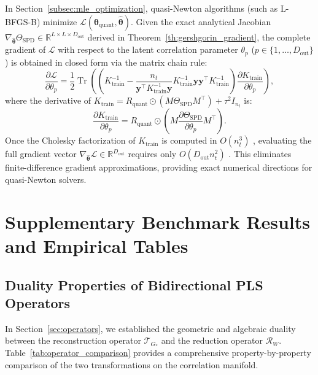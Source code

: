 \documentclass[default,sn-mathphys,Numbered]{sn-jnl}
\theoremstyle{thmstyleone}
\theoremstyle{thmstylethree}
\theoremstyle{thmstyletwo}
\newcommand{\outp}{\text{out}}
\newcommand{\Tr}{\operatorname{Tr}}
\begin{document}
\begin{appendices}
In Section~\ref{subsec:mle_optimization}, quasi-Newton algorithms (such as L-BFGS-B) minimize $\mathcal{L}(\bm{\theta}_{\mathrm{quant}}, \hat{\bm{\theta}})$. Given the exact analytical Jacobian $\nabla_{\hat{\bm{\theta}}} \Theta_{\mathrm{SPD}} \in \mathbb{R}^{L \times L \times D_{\outp}}$ derived in Theorem~\ref{th:gershgorin_gradient}, the complete gradient of $\mathcal{L}$ with respect to the latent correlation parameter $\theta_p$ ($p \in \{1, \ldots, D_{\outp}\}$) is obtained in closed form via the matrix chain rule:
\begin{equation}
\label{eq:full_likelihood_gradient}
\frac{\partial \mathcal{L}}{\partial \theta_p} = \frac{1}{2} \Tr\left( \left( K_{\mathrm{train}}^{-1} - \frac{n_t}{\bm{y}^\top K_{\mathrm{train}}^{-1} \bm{y}} K_{\mathrm{train}}^{-1} \bm{y} \bm{y}^\top K_{\mathrm{train}}^{-1} \right) \frac{\partial K_{\mathrm{train}}}{\partial \theta_p} \right),
\end{equation}
where the derivative of $K_{\mathrm{train}} = R_{\mathrm{quant}} \odot (M \Theta_{\mathrm{SPD}} M^\top) + \tau^2 I_{n_t}$ is:
\begin{equation}
\label{eq:cov_deriv_chain}
\frac{\partial K_{\mathrm{train}}}{\partial \theta_p} = R_{\mathrm{quant}} \odot \left( M \frac{\partial \Theta_{\mathrm{SPD}}}{\partial \theta_p} M^\top \right).
\end{equation}
Once the Cholesky factorization of $K_{\mathrm{train}}$ is computed in $O(n_t^3)$ , evaluating the full gradient vector $\nabla_{\hat{\bm{\theta}}} \mathcal{L} \in \mathbb{R}^{D_{\outp}}$ requires only $O(D_{\outp} n_t^2)$ . This eliminates finite-difference gradient approximations, providing exact numerical directions for quasi-Newton solvers.


\section{Supplementary Benchmark Results and Empirical Tables}
\label{sec:appendix_benchmarks}

\subsection{Duality Properties of Bidirectional PLS Operators}
\label{subsec:app_operator_duality}

In Section~\ref{sec:operators}, we established the geometric and algebraic duality between the reconstruction operator $\mathcal{T}_{G_*}$ and the reduction operator $\mathcal{R}_W$. Table~\ref{tab:operator_comparison} provides a comprehensive property-by-property comparison of the two transformations on the correlation manifold.


\end{appendices}
\end{document}
